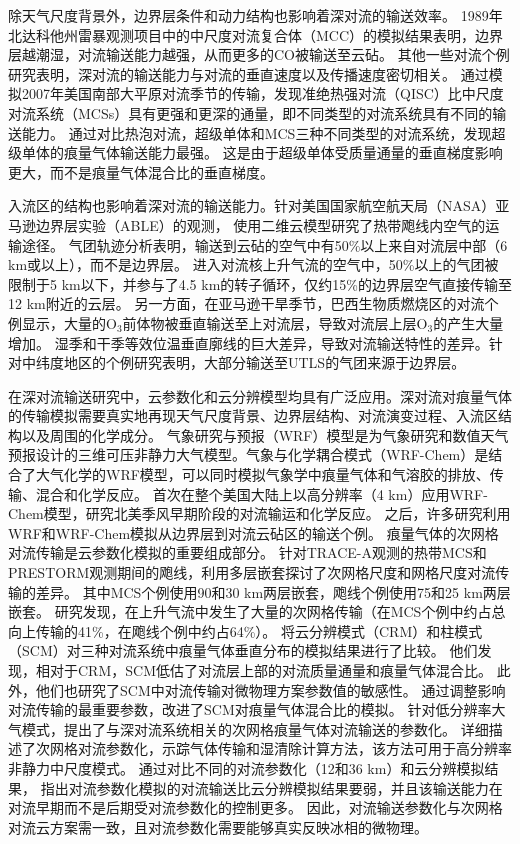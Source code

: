 除天气尺度背景外，边界层条件和动力结构也影响着深对流的输送效率。
1989年北达科他州雷暴观测项目中的中尺度对流复合体（MCC）的模拟结果表明，边界层越潮湿，对流输送能力越强，从而更多的CO被输送至云砧\citep{Stenchikov.1996}。
其他一些对流个例研究表明，深对流的输送能力与对流的垂直速度以及传播速度密切相关\citep{Pickering.1992a,Wang.1996}。
\citet{Bigelbach.2014}通过模拟2007年美国南部大平原对流季节的传输，发现准绝热强对流（QISC）比中尺度对流系统（MCSs）具有更强和更深的通量，即不同类型的对流系统具有不同的输送能力。
\citet{Li.2017b}通过对比热泡对流，超级单体和MCS三种不同类型的对流系统，发现超级单体的痕量气体输送能力最强。
这是由于超级单体受质量通量的垂直梯度影响更大，而不是痕量气体混合比的垂直梯度。

入流区的结构也影响着深对流的输送能力。针对美国国家航空航天局（NASA）亚马逊边界层实验（ABLE）的观测，
\citet{Scala.1990}使用二维云模型研究了热带飑线内空气的运输途径。
气团轨迹分析表明，输送到云砧的空气中有50\%以上来自对流层中部（6 km或以上），而不是边界层。
进入对流核上升气流的空气中，50\%以上的气团被限制于5 km以下，并参与了4.5 km的转子循环，仅约15\%的边界层空气直接传输至12 km附近的云层。
另一方面，在亚马逊干旱季节，巴西生物质燃烧区的对流个例显示，大量的O$_3$前体物被垂直输送至上对流层，导致对流层上层O$_3$的产生大量增加\citep{Pickering.1992,Pickering.1992a,Pickering.1996}。
湿季和干季等效位温垂直廓线的巨大差异，导致对流输送特性的差异。针对中纬度地区的个例研究表明，大部分输送至UTLS的气团来源于边界层\citep{Mullendore.2005,Skamarock.2000}。

在深对流输送研究中，云参数化和云分辨模型均具有广泛应用。深对流对痕量气体的传输模拟需要真实地再现天气尺度背景、边界层结构、对流演变过程、入流区结构以及周围的化学成分。 气象研究与预报（WRF）模型是为气象研究和数值天气预报设计的三维可压非静力大气模型。气象与化学耦合模式（WRF-Chem）是结合了大气化学的WRF模型，可以同时模拟气象学中痕量气体和气溶胶的排放、传输、混合和化学反应\citep{Fast.2006,Grell.2005}。
\citet{Barth.2012}首次在整个美国大陆上以高分辨率（4 km）应用WRF-Chem模型，研究北美季风早期阶段的对流输运和化学反应。
之后，许多研究利用WRF和WRF-Chem模拟从边界层到对流云砧区的输送个例\citep{Bela.2016,Li.2017b,Li.2018}。
痕量气体的次网格对流传输是云参数化模拟的重要组成部分。
\citet{Wang.1996}针对TRACE-A观测的热带MCS和PRESTORM观测期间的飑线，利用多层嵌套探讨了次网格尺度和网格尺度对流传输的差异。
其中MCS个例使用90和30 km两层嵌套，飑线个例使用75和25 km两层嵌套。
研究发现，在上升气流中发生了大量的次网格传输（在MCS个例中约占总向上传输的41\%，在飑线个例中约占64\%）。
\citet{Ott.2009}将云分辨模式（CRM）和柱模式（SCM）对三种对流系统中痕量气体垂直分布的模拟结果进行了比较。
他们发现，相对于CRM，SCM低估了对流层上部的对流质量通量和痕量气体混合比。
此外，他们也研究了SCM中对流传输对微物理方案参数值的敏感性。
通过调整影响对流传输的最重要参数，改进了SCM对痕量气体混合比的模拟。
\citet{Freitas.2000}针对低分辨率大气模式，提出了与深对流系统相关的次网格痕量气体对流输送的参数化。
\citet{Grell.2014}详细描述了次网格对流参数化，示踪气体传输和湿清除计算方法，该方法可用于高分辨率非静力中尺度模式。
\citet{Li.2018}通过对比不同的对流参数化（12和36 km）和云分辨模拟结果，
指出对流参数化模拟的对流输送比云分辨模拟结果要弱，并且该输送能力在对流早期而不是后期受对流参数化的控制更多。
因此，对流输送参数化与次网格对流云方案需一致，且对流参数化需要能够真实反映冰相的微物理。

